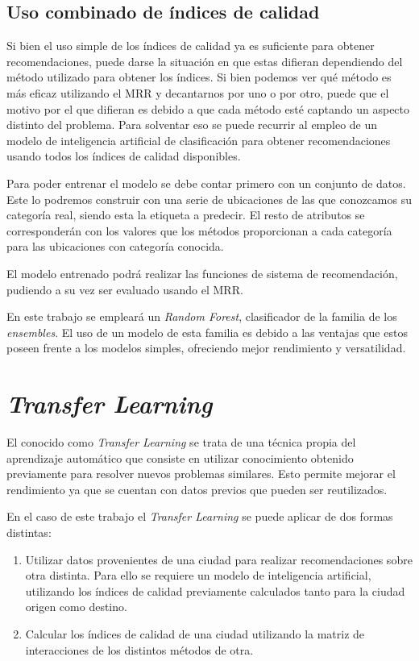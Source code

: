 \subsection{Uso combinado de índices de calidad}

Si bien el uso simple de los índices de calidad ya es suficiente para obtener recomendaciones, puede darse la situación en que estas difieran dependiendo del método utilizado para obtener los índices. Si bien podemos ver qué método es más eficaz utilizando el MRR y decantarnos por uno o por otro, puede que el motivo por el que difieran es debido a que cada método esté captando un aspecto distinto del problema. Para solventar eso se puede recurrir al empleo de un modelo de inteligencia artificial de clasificación para obtener recomendaciones usando todos los índices de calidad disponibles.

Para poder entrenar el modelo se debe contar primero con un conjunto de datos. Este lo podremos construir con una serie de ubicaciones de las que conozcamos su categoría real, siendo esta la etiqueta a predecir. El resto de atributos se corresponderán con los valores que los métodos proporcionan a cada categoría para las ubicaciones con categoría conocida.

El modelo entrenado podrá realizar las funciones de sistema de recomendación, pudiendo a su vez ser evaluado usando el MRR.

En este trabajo se empleará un \textit{Random Forest}, clasificador de la familia de los \textit{ensembles}. El uso de un modelo de esta familia es debido a las ventajas que estos poseen frente a los modelos simples, ofreciendo mejor rendimiento y versatilidad.

\section{\textit{Transfer Learning}}

El conocido como \textit{Transfer Learning} se trata de una técnica propia del aprendizaje automático que consiste en utilizar conocimiento obtenido previamente para resolver nuevos problemas similares. Esto permite mejorar el rendimiento ya que se cuentan con datos previos que pueden ser reutilizados.

En el caso de este trabajo el \textit{Transfer Learning} se puede aplicar de dos formas distintas:

\begin{enumerate}
	\item Utilizar datos provenientes de una ciudad para realizar recomendaciones sobre otra distinta. Para ello se requiere un modelo de inteligencia artificial, utilizando los índices de calidad previamente calculados tanto para la ciudad origen como destino.
	\item  Calcular los índices de calidad de una ciudad utilizando la matriz de interacciones de los distintos métodos de otra.
\end{enumerate}


